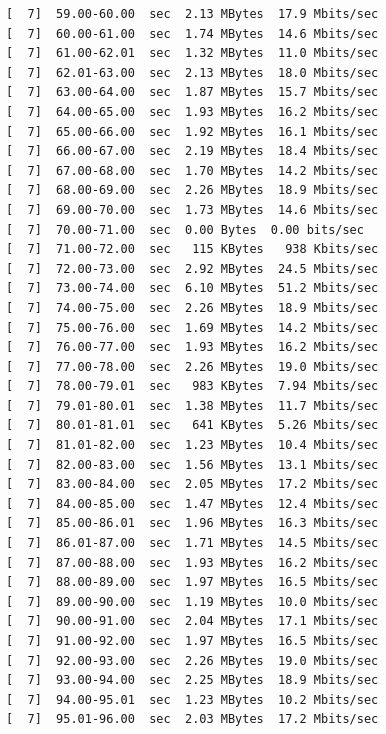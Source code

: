 \documentclass[12pt]{article}
\begin{document}
\begin{enumerate}
\begin{latin}
\begin{Verbatim}
[  7]  59.00-60.00  sec  2.13 MBytes  17.9 Mbits/sec                  
[  7]  60.00-61.00  sec  1.74 MBytes  14.6 Mbits/sec                  
[  7]  61.00-62.01  sec  1.32 MBytes  11.0 Mbits/sec                  
[  7]  62.01-63.00  sec  2.13 MBytes  18.0 Mbits/sec                  
[  7]  63.00-64.00  sec  1.87 MBytes  15.7 Mbits/sec                  
[  7]  64.00-65.00  sec  1.93 MBytes  16.2 Mbits/sec                  
[  7]  65.00-66.00  sec  1.92 MBytes  16.1 Mbits/sec                  
[  7]  66.00-67.00  sec  2.19 MBytes  18.4 Mbits/sec                  
[  7]  67.00-68.00  sec  1.70 MBytes  14.2 Mbits/sec                  
[  7]  68.00-69.00  sec  2.26 MBytes  18.9 Mbits/sec                  
[  7]  69.00-70.00  sec  1.73 MBytes  14.6 Mbits/sec                  
[  7]  70.00-71.00  sec  0.00 Bytes  0.00 bits/sec                  
[  7]  71.00-72.00  sec   115 KBytes   938 Kbits/sec                  
[  7]  72.00-73.00  sec  2.92 MBytes  24.5 Mbits/sec                  
[  7]  73.00-74.00  sec  6.10 MBytes  51.2 Mbits/sec                  
[  7]  74.00-75.00  sec  2.26 MBytes  18.9 Mbits/sec                  
[  7]  75.00-76.00  sec  1.69 MBytes  14.2 Mbits/sec                  
[  7]  76.00-77.00  sec  1.93 MBytes  16.2 Mbits/sec                  
[  7]  77.00-78.00  sec  2.26 MBytes  19.0 Mbits/sec                  
[  7]  78.00-79.01  sec   983 KBytes  7.94 Mbits/sec                  
[  7]  79.01-80.01  sec  1.38 MBytes  11.7 Mbits/sec                  
[  7]  80.01-81.01  sec   641 KBytes  5.26 Mbits/sec                  
[  7]  81.01-82.00  sec  1.23 MBytes  10.4 Mbits/sec                  
[  7]  82.00-83.00  sec  1.56 MBytes  13.1 Mbits/sec                  
[  7]  83.00-84.00  sec  2.05 MBytes  17.2 Mbits/sec                  
[  7]  84.00-85.00  sec  1.47 MBytes  12.4 Mbits/sec                  
[  7]  85.00-86.01  sec  1.96 MBytes  16.3 Mbits/sec                  
[  7]  86.01-87.00  sec  1.71 MBytes  14.5 Mbits/sec                  
[  7]  87.00-88.00  sec  1.93 MBytes  16.2 Mbits/sec                  
[  7]  88.00-89.00  sec  1.97 MBytes  16.5 Mbits/sec                  
[  7]  89.00-90.00  sec  1.19 MBytes  10.0 Mbits/sec                  
[  7]  90.00-91.00  sec  2.04 MBytes  17.1 Mbits/sec                  
[  7]  91.00-92.00  sec  1.97 MBytes  16.5 Mbits/sec                  
[  7]  92.00-93.00  sec  2.26 MBytes  19.0 Mbits/sec                  
[  7]  93.00-94.00  sec  2.25 MBytes  18.9 Mbits/sec                  
[  7]  94.00-95.01  sec  1.23 MBytes  10.2 Mbits/sec                  
[  7]  95.01-96.00  sec  2.03 MBytes  17.2 Mbits/sec                  

\end{Verbatim}
\end{latin}
\end{enumerate}
\end{document}
